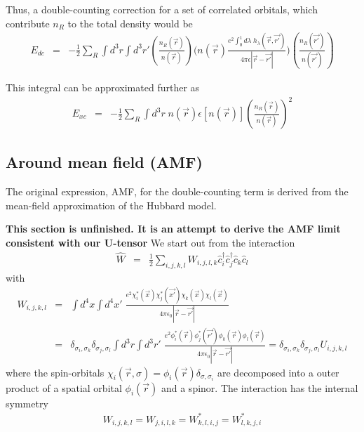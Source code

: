 \documentclass[11pt,a4paper]{report}
\begin{document}
Thus, a double-counting correction for a set of correlated orbitals,
which contribute $n_R$ to the total density would be
\begin{eqnarray}
E_{dc}
&=&-\frac{1}{2}\sum_{R}\int d^3r\int d^3r'
\left(\frac{n_R(\vec{r})}{n(\vec{r})}\right)
\biggl(
n(\vec{r})
\frac{e^2 \int_0^1d\lambda\;h_\lambda (\vec{r},\vec{r'})}
{4\pi\epsilon|\vec{r}-\vec{r'}|}\biggr)
\left(\frac{n_{R}(\vec{r'})}{n(\vec{r'})}\right)
\end{eqnarray}



This integral can be approximated further as
\begin{eqnarray}
E_{xc}
&=&-\frac{1}{2}\sum_{R}\int d^3r\; n(\vec{r})\epsilon[n(\vec{r})]
\left(\frac{n_R(\vec{r})}{n(\vec{r})}\right)^2
\end{eqnarray}


\subsection{Around mean field (AMF)}
The original expression, AMF, for the double-counting term is derived
from the mean-field approximation of the Hubbard model.

\textbf{This section is unfinished. It is an attempt to derive the AMF
  limit consistent with our U-tensor}
We start out from the interaction
\begin{eqnarray}
\hat{W}&=&
\frac{1}{2}\sum_{i,j,k,l}W_{i,j,l,k} 
\hat{c}^\dagger_i\hat{c}^\dagger_j\hat{c}_k\hat{c}_l
\end{eqnarray}
with 
\begin{eqnarray}
W_{i,j,k,l}&=&
\int d^4x\int d^4x'\; \frac{e^2
\chi_i^*(\vec{x})\chi_j^*(\vec{x'})\chi_k(\vec{x})\chi_l(\vec{x})}
{4\pi\epsilon_0|\vec{r}-\vec{r'}|}
\nonumber\\
&=&
\delta_{\sigma_i,\sigma_k}
\delta_{\sigma_j,\sigma_l}
\int d^3r\int d^3r'\; \frac{e^2
\phi_i^*(\vec{r})\phi_j^*(\vec{r'})\phi_k(\vec{r})\phi_l(\vec{r})}
{4\pi\epsilon_0|\vec{r}-\vec{r'}|}
=\delta_{\sigma_i,\sigma_k}
\delta_{\sigma_j,\sigma_l}
U_{i,j,k,l}
\end{eqnarray}
where the spin-orbitals
$\chi_i(\vec{r},\sigma)=\phi_i(\vec{r})\delta_{\sigma,\sigma_i}$ are
decomposed into a outer product of a spatial orbital $\phi_i(\vec{r})$
and a spinor. The interaction has the internal symmetry
\begin{eqnarray}
W_{i,j,k,l}=W_{j,i,l,k}=W^*_{k,l,i,j}=W^*_{l,k,j,i}
\end{eqnarray}
\end{document}
